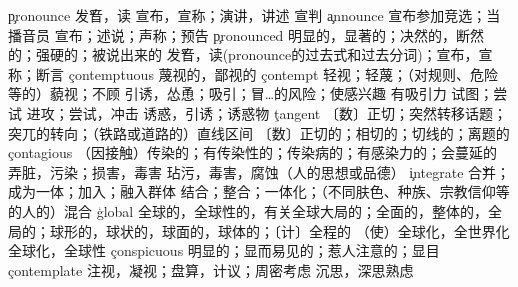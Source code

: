 \begin{multicols}{2}
\c{pronounce}  \v 发音，读 \vt 宣布，宣称；演讲，讲述 \vi 宣判
\c{announce}  \vi 宣布参加竞选；当播音员 \vt 宣布；述说；声称；预告
\c{pronounced}  \a 明显的，显著的；决然的，断然的；强硬的；被说出来的 \v 发音，读(pronounce的过去式和过去分词)；宣布，宣称；断言
\c{contemptuous}  \a 蔑视的，鄙视的
\c{contempt}  \n 轻视；轻蔑；（对规则、危险等的）藐视；不顾
  \vt 引诱，怂恿；吸引；冒…的风险；使感兴趣 \vi 有吸引力
  \vt 试图；尝试 \n 进攻；尝试，冲击
  \n 诱惑，引诱；诱惑物
\c{tangent}  \n 〔数〕正切；突然转移话题；突兀的转向；（铁路或道路的）直线区间 \a 〔数〕正切的；相切的；切线的；离题的
\c{contagious}  \a （因接触）传染的；有传染性的；传染病的；有感染力的；会蔓延的
  \vt 弄脏，污染；损害，毒害 \vi 玷污，毒害，腐蚀（人的思想或品德）
\c{integrate}  \v 合并；成为一体；加入；融入群体
  \n 结合；整合；一体化；（不同肤色、种族、宗教信仰等的人的）混合 
\c{global}  \a 全球的，全球性的，有关全球大局的；全面的，整体的，全局的；球形的，球状的，球面的，球体的；〔计〕全程的
  \vt （使）全球化，全世界化
  \n 全球化，全球性
\c{conspicuous}  \a 明显的；显而易见的；惹人注意的；显目
\c{contemplate}  \vt 注视，凝视；盘算，计议；周密考虑 \vi 沉思，深思熟虑


\end{multicols}
